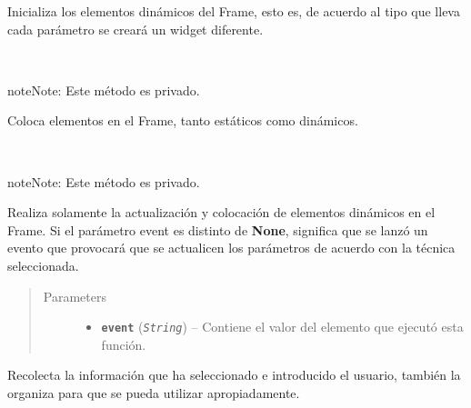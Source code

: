 \documentclass[class=report, crop=false]{standalone}
\begin{document}
\begin{fulllineitems}
\begin{fulllineitems}
Inicializa los elementos dinámicos del Frame, esto es, de acuerdo 
al tipo que lleva cada parámetro se creará un widget diferente.

\end{fulllineitems}

\begin{fulllineitems}

~

\begin{notice}{note}{Note:}
Este método es privado.
\end{notice}

Coloca elementos en el Frame, tanto estáticos como dinámicos.

\end{fulllineitems}

\begin{fulllineitems}

~

\begin{notice}{note}{Note:}
Este método es privado.
\end{notice}

Realiza solamente la actualización y colocación de elementos dinámicos 
en el Frame.\break
Si el parámetro event es distinto de \textbf{None}, significa que se 
lanzó un evento que provocará que se actualicen los parámetros de 
acuerdo con la técnica seleccionada.

\begin{quote}\begin{description}
\item[{Parameters}] \leavevmode\begin{itemize}
\item \textbf{\texttt{event}} (\emph{\texttt{String}}) -- Contiene el valor del elemento que ejecutó esta función.
\end{itemize}
\end{description}\end{quote}

\end{fulllineitems}

\begin{fulllineitems}

Recolecta la información que ha seleccionado e introducido 
el usuario, también la organiza para que se pueda utilizar 
apropiadamente.


\end{fulllineitems}
\end{fulllineitems}
\end{document}

